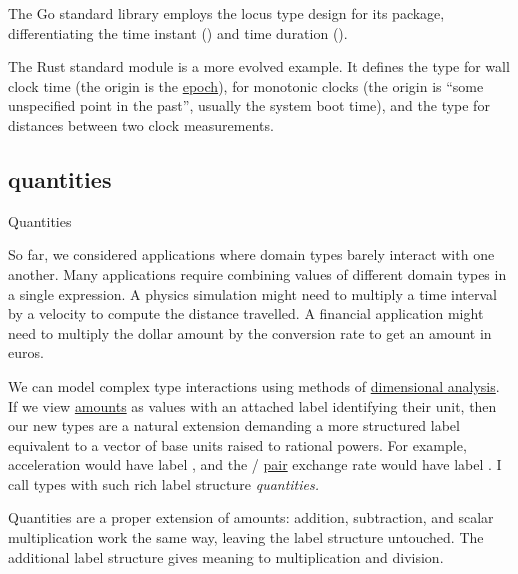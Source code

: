 \documentclass{article}
\begin{document}
The Go standard library employs the locus type design for its \href{https://pkg.go.dev/time}{} package, differentiating the time instant (\href{https://pkg.go.dev/time#Time}{}) and time duration (\href{https://pkg.go.dev/time#Duration}{}).

The Rust standard module \href{https://doc.rust-lang.org/std/time/index.html}{} is a more evolved example.
It defines the \href{https://doc.rust-lang.org/std/time/struct.SystemTime.html}{} type for wall clock time (the origin is the \href{https://doc.rust-lang.org/std/time/struct.SystemTime.html#associatedconstant.UNIX_EPOCH}{ epoch}), \href{https://doc.rust-lang.org/std/time/struct.Instant.html}{} for monotonic clocks (the origin is ``some unspecified point in the past'', usually the system boot time), and the \href{https://doc.rust-lang.org/std/time/struct.Duration.html}{} type for distances between two clock measurements.

\subsection{quantities}{Quantities}

So far, we considered applications where domain types barely interact with one another.
Many applications require combining values of different domain types in a single expression.
A physics simulation might need to multiply a time interval by a velocity to compute the distance travelled.
A financial application might need to multiply the dollar amount by the conversion rate to get an amount in euros.

We can model complex type interactions using methods of \href{https://en.wikipedia.org/wiki/Dimensional_analysis}{dimensional analysis}.
If we view \href{#amounts}{amounts} as values with an attached label identifying their unit, then our new types are a natural extension demanding a more structured label equivalent to a vector of base units raised to rational powers.
For example, acceleration would have label , and the / \href{https://en.wikipedia.org/wiki/Currency_pair}{pair} exchange rate would have label .
I call types with such rich label structure \em{quantities}.

Quantities are a proper extension of amounts: addition, subtraction, and scalar multiplication work the same way, leaving the label structure untouched.
The additional label structure gives meaning to multiplication and division.
\end{document}
